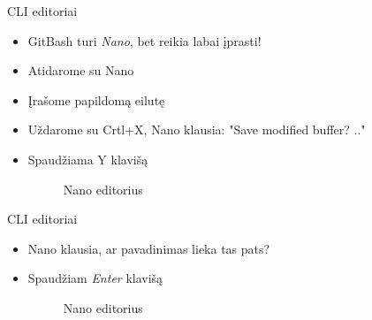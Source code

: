 \documentclass[11pt,xcolor=table]{beamer}
\begin{document}
\begin{frame}[fragile]{CLI editoriai}
\begin{itemize}
\item GitBash turi \textit{Nano}, bet reikia labai įprasti!
\item Atidarome su Nano
\item Įrašome papildomą eilutę
\item Uždarome su Crtl+X, Nano klausia: "Save modified buffer? .."
\item Spaudžiama Y klavišą
\begin{figure}
\caption{Nano editorius}
\end{figure}
\end{itemize}
\end{frame}



\begin{frame}[fragile]{CLI editoriai}
\begin{itemize}
\item Nano klausia, ar pavadinimas lieka tas pats?
\item Spaudžiam \textit{Enter} klavišą

\begin{figure}
\caption{Nano editorius}
\end{figure}
\end{itemize}
\end{frame}
\end{document}
